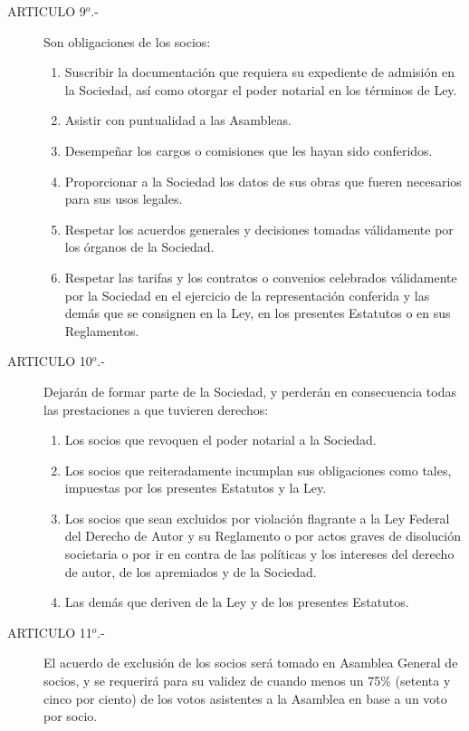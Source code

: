 \documentclass[11pt,letterpaper]{report}
\begin{document}
\begin{description}
\item[ARTICULO 9$^{o}$.-] Son obligaciones de los socios:\\
\begin{enumerate}
\item Suscribir la documentaci\'on que requiera su expediente de admisi\'on en la Sociedad, as\'i como otorgar el poder notarial en los t\'erminos de Ley.
\item Asistir con puntualidad a las Asambleas.
\item Desempe\~nar los cargos o comisiones que les hayan sido conferidos.
\item Proporcionar a la Sociedad los datos de sus obras que fueren necesarios para sus usos legales.
\item Respetar los acuerdos generales y decisiones tomadas v\'alidamente por los \'organos de la Sociedad.
\item Respetar las tarifas y los contratos o convenios celebrados v\'alidamente por la Sociedad en el ejercicio de la representaci\'on conferida y las dem\'as que se consignen en la Ley, en los presentes Estatutos o en sus Reglamentos.
\end{enumerate}

\item[ARTICULO 10$^{o}$.-] Dejar\'an de formar parte de la Sociedad, y perder\'an en consecuencia todas las prestaciones a que tuvieren derechos:
\begin{enumerate}
\item  Los socios que revoquen el poder notarial a la Sociedad.
\item  Los socios que reiteradamente incumplan sus obligaciones como tales, impuestas por los presentes Estatutos y la Ley.
\item  Los socios que sean excluidos por violaci\'on flagrante a la Ley Federal del Derecho de Autor y su Reglamento o por actos graves de disoluci\'on societaria o por ir en contra de las pol\'iticas y los intereses del derecho de autor, de los apremiados y de la Sociedad.
\item  Las dem\'as que deriven de la Ley y de los presentes Estatutos.
\end{enumerate}

\item[ARTICULO 11$^{o}$.-] El acuerdo de exclusi\'on de los socios ser\'a tomado en Asamblea General de socios, y se requerir\'a para su validez de cuando menos un 75\% (setenta y cinco por ciento) de los votos asistentes a la Asamblea en base a un voto por socio.
\end{description}
\end{document}
